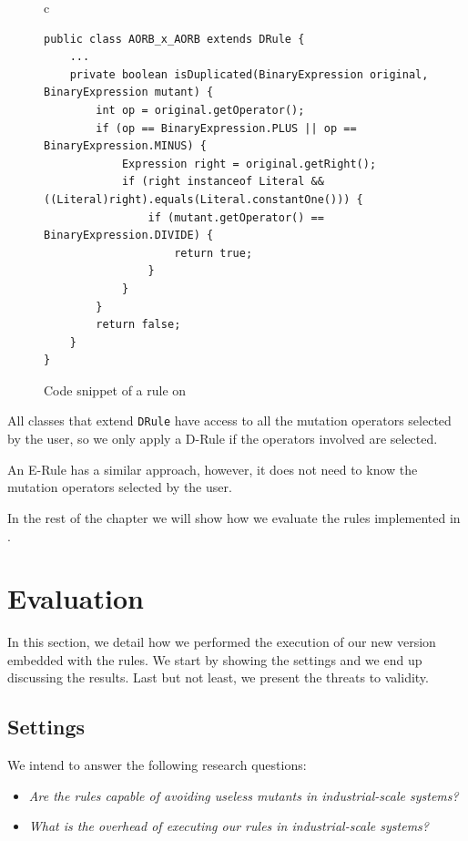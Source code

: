 \begin{figure}[thp] %
\centering          %
\caption{Code snippet of a rule on \mujava{}}
\begin{tabular}{c}  %
\begin{lstlisting}[label={lst:code01}, basicstyle=\fontsize{7.5}{11}\ttfamily, linewidth=.95\linewidth]
public class AORB_x_AORB extends DRule {
    ...
    private boolean isDuplicated(BinaryExpression original, BinaryExpression mutant) {
        int op = original.getOperator();
        if (op == BinaryExpression.PLUS || op == BinaryExpression.MINUS) {
            Expression right = original.getRight();
            if (right instanceof Literal && ((Literal)right).equals(Literal.constantOne())) {
                if (mutant.getOperator() == BinaryExpression.DIVIDE) {
                    return true;
                }
            }
        }
        return false;
    }
}
\end{lstlisting}
\end{tabular}
\end{figure}

All classes that extend \texttt{DRule} have access to all the mutation operators selected by the user, so we only apply a D-Rule if the operators involved are selected.

An E-Rule has a similar approach, however, it does not need to know the mutation operators selected by the user.

In the rest of the chapter we will show how we evaluate the rules implemented in \mujava{}.


\section{Evaluation}
\label{sec:evaluation}
In this section, we detail how we performed the execution of our new \mujava{} version embedded with the rules.
We start by showing the settings and we end up discussing the results. 
Last but not least, we present the threats to validity.

\subsection{Settings}
\label{sec:evaluation-settings}

We intend to answer the following research questions: 

\begin{itemize}
    
    \item \textit{Are the rules capable of avoiding useless mutants in industrial-scale systems?}
    
    \item \textit{What is the overhead of executing our rules in industrial-scale systems?}

\end{itemize}

